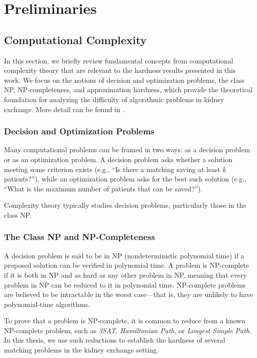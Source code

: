 \chapter{Preliminaries}
\label{cha:preliminaries}


\section{Computational Complexity}
\label{sec:computational_complexity}

In this section, we briefly review fundamental concepts from computational complexity theory that are relevant to the hardness results presented in this work. We focus on the notions of decision and optimization problems, the class NP, NP-completeness, and approximation hardness, which provide the theoretical foundation for analyzing the difficulty of algorithmic problems in kidney exchange. More detail can be found in \cite{garey1979computers}.

\subsection*{Decision and Optimization Problems}

Many computational problems can be framed in two ways: as a decision problem or as an optimization problem. A decision problem asks whether a solution meeting some criterion exists (e.g., “Is there a matching saving at least $k$ patients?”), while an optimization problem asks for the best such solution (e.g., “What is the maximum number of patients that can be saved?”).

Complexity theory typically studies decision problems, particularly those in the class NP.

\subsection*{The Class NP and NP-Completeness}

A decision problem is said to be in NP (nondeterministic polynomial time) if a proposed solution can be verified in polynomial time. A problem is NP-complete if it is both in NP and as hard as any other problem in NP, meaning that every problem in NP can be reduced to it in polynomial time. NP-complete problems are believed to be intractable in the worst case—that is, they are unlikely to have polynomial-time algorithms.

To prove that a problem is NP-complete, it is common to reduce from a known NP-complete problem, such as \textit{3SAT}, \textit{Hamiltonian Path}, or \textit{Longest Simple Path}. In this thesis, we use such reductions to establish the hardness of several matching problems in the kidney exchange setting.

